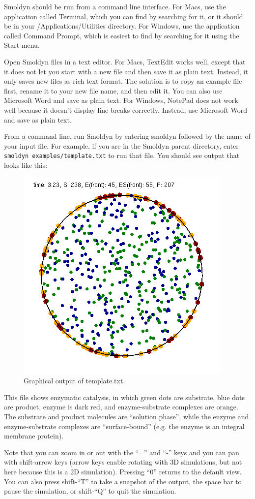 \documentclass {scrbook}
\newcommand {\ttt} {\texttt}
\begin{document}
Smoldyn should be run from a command line interface. For Macs, use the application called Terminal, which you can find by searching for it, or it should be in your /Applications/Utilities directory. For Windows, use the application called Command Prompt, which is easiest to find by searching for it using the Start menu.

Open Smoldyn files in a text editor. For Macs, TextEdit works well, except that it does not let you start with a new file and then save it as plain text. Instead, it only saves new files as rich text format. The solution is to copy an example file first, rename it to your new file name, and then edit it. You can also use Microsoft Word and save as plain text. For Windows, NotePad does not work well because it doesn't display line breaks correctly. Instead, use Microsoft Word and save as plain text.

From a command line, run Smoldyn by entering smoldyn followed by the name of your input file. For example, if you are in the Smoldyn parent directory, enter  \ttt{smoldyn examples/template.txt} to run that file. You should see output that looks like this:

\begin{figure}[h]
\centering
\includegraphics[height=5 cm]{figures/image1.png}
\caption{Graphical output of template.txt.}
\label{fig:template}
\end{figure}

This file shows enzymatic catalysis, in which green dots are substrate, blue dots are product, enzyme is dark red, and enzyme-substrate complexes are orange. The substrate and product molecules are ``solution phase'', while the enzyme and enzyme-substrate complexes are ``surface-bound'' (e.g. the enzyme is an integral membrane protein).

Note that you can zoom in or out with the ``='' and ``-'' keys and you can pan with shift-arrow keys (arrow keys enable rotating with 3D simulations, but not here because this is a 2D simulation). Pressing ``0'' returns to the default view. You can also press shift-``T'' to take a snapshot of the output, the space bar to pause the simulation, or shift-``Q'' to quit the simulation.
\end{document}

